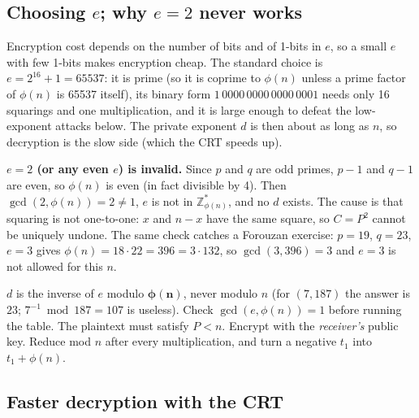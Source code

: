 \subsection{Choosing $e$; why $e = 2$ never works \new}
Encryption cost depends on the number of bits and of 1-bits in $e$, so a small $e$ with few 1-bits makes encryption cheap. The standard choice is $e = 2^{16} + 1 = 65537$: it is prime (so it is coprime to $\phi(n)$ unless a prime factor of $\phi(n)$ is 65537 itself), its binary form $1\,0000\,0000\,0000\,0001$ needs only 16 squarings and one multiplication, and it is large enough to defeat the low-exponent attacks below. The private exponent $d$ is then about as long as $n$, so decryption is the slow side (which the CRT speeds up).

\textbf{$e = 2$ (or any even $e$) is invalid.} Since $p$ and $q$ are odd primes, $p - 1$ and $q - 1$ are even, so $\phi(n)$ is even (in fact divisible by 4). Then $\gcd(2, \phi(n)) = 2 \ne 1$, $e$ is not in $\mathbb{Z}_{\phi(n)}^*$, and no $d$ exists. The cause is that squaring is not one-to-one: $x$ and $n - x$ have the same square, so $C = P^2$ cannot be uniquely undone. The same check catches a Forouzan exercise: $p = 19$, $q = 23$, $e = 3$ gives $\phi(n) = 18 \cdot 22 = 396 = 3 \cdot 132$, so $\gcd(3, 396) = 3$ and $e = 3$ is not allowed for this $n$.

\begin{trap}
$d$ is the inverse of $e$ modulo $\boldsymbol{\phi(n)}$, never modulo $n$ (for $(7, 187)$ the answer is $23$; $7^{-1} \bmod 187 = 107$ is useless). Check $\gcd(e, \phi(n)) = 1$ before running the table. The plaintext must satisfy $P < n$. Encrypt with the \emph{receiver's} public key. Reduce mod $n$ after every multiplication, and turn a negative $t_1$ into $t_1 + \phi(n)$.
\end{trap}

\subsection{Faster decryption with the CRT \new}


